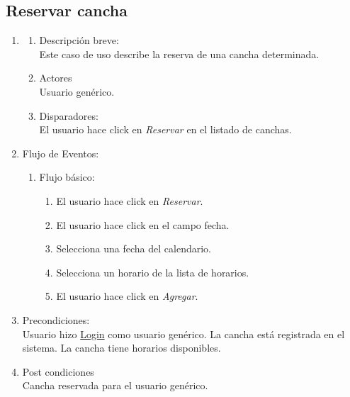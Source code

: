 \documentclass[a4paper,11pt]{article}
\begin{document}
\subsection{Reservar cancha}
\begin{enumerate}

    \item
    \begin{enumerate}
    \item Descripción breve: \\
        Este caso de uso describe la reserva de una cancha determinada.
    \item Actores \\
        Usuario genérico.
    \item Disparadores: \\
        El usuario hace click en \emph{Reservar} en el listado de canchas.
    \end{enumerate}

    \item Flujo de Eventos: 

    \begin{enumerate}

        \item Flujo básico:
		\begin{enumerate}
		\item	El usuario hace click en \emph{Reservar}.
		\item	El usuario hace click en el campo fecha.
		\item	Selecciona una fecha del calendario.
		\item	Selecciona un horario de la lista de horarios.		
		\item	El usuario hace click en \emph{Agregar}.
    		\end{enumerate}
    \end{enumerate}

    \item Precondiciones: \\
        Usuario hizo \underline{Login} como usuario genérico.
        La cancha está registrada en el sistema.
	La cancha tiene horarios disponibles.

    \item Post condiciones \\
        Cancha reservada para el usuario genérico.

\end{enumerate}

\end{document}
